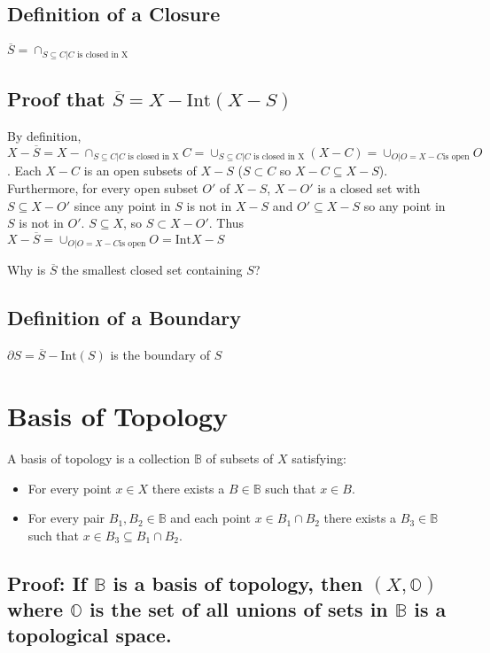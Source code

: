 \documentclass{homework}
\newcommand{\inte}{\text{Int}}
\newcommand{\clos}[1]{\overline{#1}}
\newcommand{\BB}{\mathbb{B}}
\newcommand{\OO}{\mathbb{O}}
\begin{document}
\subsection{Definition of a Closure}
$\clos{S} = \cap_{S \subseteq C | C \text{ is closed in X}}$
\subsection{Proof that $\clos{S} = X - \inte(X - S)$}

By definition, $X - \clos{S} = X -  \cap_{S \subseteq C | C \text{ is closed in X}} C = \cup_{S \subseteq C | C \text{ is closed in X}}(X - C) = \cup_{O| O = X - C \text{is open} }O$. Each $X - C$ is an open subsets of $X - S$ ($S \subset C$ so $X - C \subseteq X - S$). Furthermore, for every open subset $O'$ of $X -S$, $X - O'$ is a closed set with $S \subseteq X - O'$ since any point in $S$ is not in $X - S$ and $O' \subseteq X - S$ so any point in $S$ is not in $O'$. $S \subseteq X$, so $S \subset X - O'$. Thus$X - \clos{S} = \cup_{O| O = X - C \text{is open} }O = \inte{X - S}$

\question Why is $\clos{S}$ the smallest closed set containing $S$?

\subsection{Definition of a Boundary}

$\partial S = \clos{S} - \inte(S)$ is the boundary of $S$

\section{Basis of Topology}
A basis of topology is a collection $\BB$ of subsets of $X$ satisfying:
\begin{itemize}
    \item For every point $x \in X$ there exists a $B \in \BB$ such that $x \in B$. 
    \item For every pair $B_1, B_2 \in \BB$ and each point $x \in B_1 \cap B_2$ there exists a $B_3 \in \BB$ such that $x \in B_3 \subseteq B_1 \cap B_2$.
\end{itemize}

\subsection{Proof: If $\BB$ is a basis of topology, then $(X, \OO)$ where $\OO$ is the set of all unions of sets in $\BB$ is a topological space. }
\end{document}
